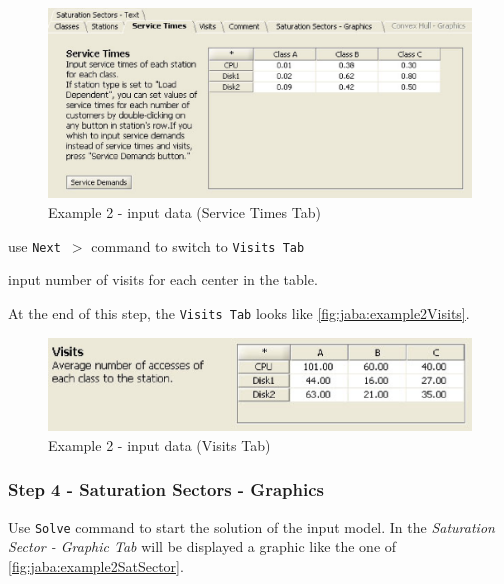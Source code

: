 \begin{figure}[htbp]
    \begin{center}
        \includegraphics[scale=.70]{img/jaba/example2Service}
    \end{center}
    \caption{Example 2 - input data (Service Times Tab)}
    \label{fig:jaba:example2Service}
\end{figure}

\begin{itemize*}
\item use \texttt{Next $>$} command to switch to \texttt{Visits Tab}
\item input number of visits for each center in the
table.
\end{itemize*}

At the end of this step, the \texttt{Visits Tab} looks like
\autoref{fig:jaba:example2Visits}.

\begin{figure}[htbp]
    \begin{center}
        \includegraphics[scale=.8]{img/jaba/example2Visits}
    \end{center}
    \caption{Example 2 - input data (Visits Tab)}
    \label{fig:jaba:example2Visits}
\end{figure}


\subsubsection{Step 4 - Saturation Sectors - Graphics}


Use \texttt{Solve} command to start the solution of the input model.
In the \textit{Saturation Sector - Graphic Tab} will be displayed a graphic like the one of
\autoref{fig:jaba:example2SatSector}.

